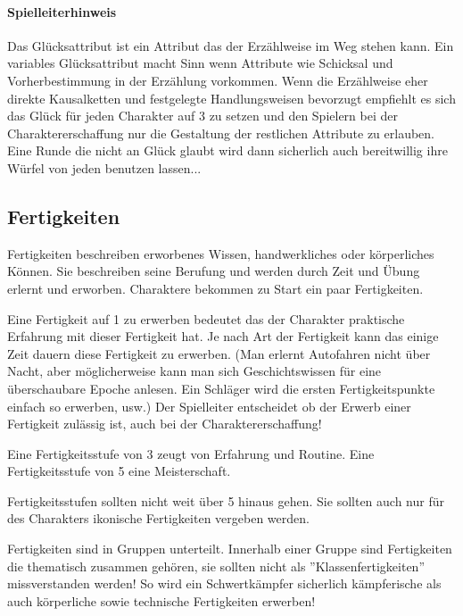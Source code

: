 \documentclass{article}
\begin{document}
\begin{mdframed}[hidealllines=true, backgroundcolor=black!10]
\paragraph{Spielleiterhinweis}

Das Glücksattribut ist ein Attribut das der Erzählweise im Weg stehen kann. Ein variables Glücksattribut macht Sinn
wenn Attribute wie Schicksal und Vorherbestimmung in der Erzählung vorkommen. Wenn die Erzählweise eher direkte
Kausalketten und festgelegte Handlungsweisen bevorzugt empfiehlt es sich das Glück für jeden Charakter auf 3 zu
setzen und den Spielern bei der Charaktererschaffung nur die Gestaltung der restlichen Attribute zu erlauben. Eine
Runde die nicht an Glück glaubt wird dann sicherlich auch bereitwillig ihre Würfel von jeden benutzen lassen...

\end{mdframed}
\begin{center}
\section{Fertigkeiten}
\end{center}

Fertigkeiten beschreiben erworbenes Wissen, handwerkliches oder körperliches Können. Sie beschreiben seine Berufung
und werden durch Zeit und Übung erlernt und erworben. Charaktere bekommen zu Start ein paar Fertigkeiten.

Eine Fertigkeit auf 1 zu erwerben bedeutet das der Charakter praktische Erfahrung mit dieser Fertigkeit hat. Je nach
Art der Fertigkeit kann das einige Zeit dauern diese Fertigkeit zu erwerben. (Man erlernt Autofahren nicht über
Nacht, aber möglicherweise kann man sich Geschichtswissen für eine überschaubare Epoche anlesen. Ein Schläger wird
die ersten Fertigkeitspunkte einfach so erwerben, usw.) Der Spielleiter entscheidet ob der Erwerb einer Fertigkeit
zulässig ist, auch bei der Charaktererschaffung!

Eine Fertigkeitsstufe von 3 zeugt von Erfahrung und Routine. Eine Fertigkeitsstufe von 5 eine Meisterschaft.

Fertigkeitsstufen sollten nicht weit über 5 hinaus gehen. Sie sollten auch nur für des Charakters ikonische
Fertigkeiten vergeben werden.

Fertigkeiten sind in Gruppen unterteilt. Innerhalb einer Gruppe sind Fertigkeiten die thematisch zusammen gehören,
sie sollten nicht als ''Klassenfertigkeiten'' missverstanden werden! So wird ein Schwertkämpfer sicherlich
kämpferische als auch körperliche sowie technische Fertigkeiten erwerben!
\end{document}
